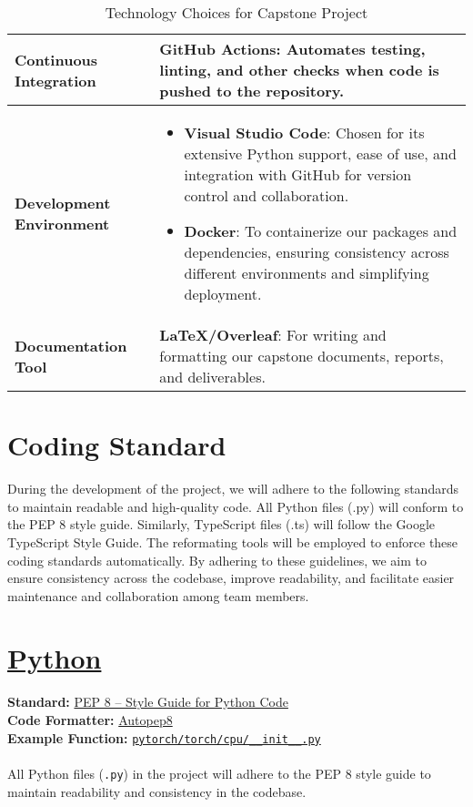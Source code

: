 \documentclass{article}
\begin{document}
\begin{table}[h!]
\begin{tabularx}{\textwidth}{| >{\raggedright\arraybackslash}m{3.5cm} | >{\raggedright\arraybackslash}X |}
        \textbf{Continuous Integration} & \textbf{GitHub Actions}: Automates testing, linting, and other checks when code is pushed to the repository. \\ \hline
        \textbf{Development Environment} & \begin{itemize}
          \item \textbf{Visual Studio Code}: Chosen for its extensive Python support, ease of use, and integration with GitHub for version control and collaboration.
          \item \textbf{Docker}: To containerize our packages and dependencies, ensuring consistency across different environments and simplifying deployment.
      \end{itemize}\\ \hline
        \textbf{Documentation Tool} & \textbf{LaTeX/Overleaf}: For writing and formatting our capstone documents, reports, and deliverables. \\ \hline
    \end{tabularx}
    \caption{Technology Choices for Capstone Project}
\end{table}

\section{Coding Standard}
During the development of the project, we will adhere to the following standards to maintain readable and high-quality code. All Python files (.py) will conform to the PEP 8 style guide. Similarly, TypeScript files (.ts) will follow the Google TypeScript Style Guide. The reformating tools will be employed to enforce these coding standards automatically. By adhering to these guidelines, we aim to ensure consistency across the codebase, improve readability, and facilitate easier maintenance and collaboration among team members.

\newpage{}
\section*{\href{https://github.com/python/cpython}{Python}}

\textbf{Standard:} \href{https://peps.python.org/pep-0008/}{PEP 8 – Style Guide for Python Code} \\
\textbf{Code Formatter:} \href{https://github.com/hhatto/autopep8}{Autopep8} \\
\textbf{Example Function:} \texttt{\href{https://github.com/pytorch/pytorch/blob/main/torch/cpu/__init__.py}{pytorch/torch/cpu/\_\_init\_\_.py}} \\\\
All Python files (\texttt{.py}) in the project will adhere to the PEP 8 style guide to maintain readability and consistency in the codebase.
\end{document}

